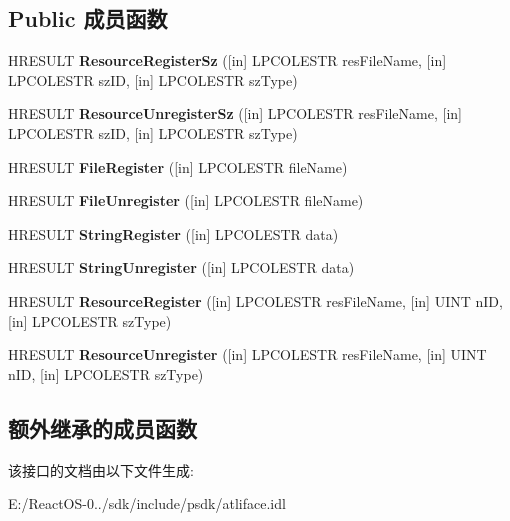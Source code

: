 \subsection*{Public 成员函数}
\begin{DoxyCompactItemize}
\item 
\mbox{\label{interface_i_registrar_aa97c1de08e4f4c6b7566a7c9be6d80df}} 
H\+R\+E\+S\+U\+LT {\bfseries Resource\+Register\+Sz} (\mbox{[}in\mbox{]} L\+P\+C\+O\+L\+E\+S\+TR res\+File\+Name, \mbox{[}in\mbox{]} L\+P\+C\+O\+L\+E\+S\+TR sz\+ID, \mbox{[}in\mbox{]} L\+P\+C\+O\+L\+E\+S\+TR sz\+Type)
\item 
\mbox{\label{interface_i_registrar_aa612d43e5518c7f2f600d6bc77cdf871}} 
H\+R\+E\+S\+U\+LT {\bfseries Resource\+Unregister\+Sz} (\mbox{[}in\mbox{]} L\+P\+C\+O\+L\+E\+S\+TR res\+File\+Name, \mbox{[}in\mbox{]} L\+P\+C\+O\+L\+E\+S\+TR sz\+ID, \mbox{[}in\mbox{]} L\+P\+C\+O\+L\+E\+S\+TR sz\+Type)
\item 
\mbox{\label{interface_i_registrar_a29a369e1816805ee2e0e9af9799609ca}} 
H\+R\+E\+S\+U\+LT {\bfseries File\+Register} (\mbox{[}in\mbox{]} L\+P\+C\+O\+L\+E\+S\+TR file\+Name)
\item 
\mbox{\label{interface_i_registrar_ad5a7091b8c89a3890f66e773734c1c3e}} 
H\+R\+E\+S\+U\+LT {\bfseries File\+Unregister} (\mbox{[}in\mbox{]} L\+P\+C\+O\+L\+E\+S\+TR file\+Name)
\item 
\mbox{\label{interface_i_registrar_a867bc505652f69dd84c8b916c601a6da}} 
H\+R\+E\+S\+U\+LT {\bfseries String\+Register} (\mbox{[}in\mbox{]} L\+P\+C\+O\+L\+E\+S\+TR data)
\item 
\mbox{\label{interface_i_registrar_affaba3f84fe6737b107e0eb86b851463}} 
H\+R\+E\+S\+U\+LT {\bfseries String\+Unregister} (\mbox{[}in\mbox{]} L\+P\+C\+O\+L\+E\+S\+TR data)
\item 
\mbox{\label{interface_i_registrar_abf4e8fa74a001891acdadc8776ada58a}} 
H\+R\+E\+S\+U\+LT {\bfseries Resource\+Register} (\mbox{[}in\mbox{]} L\+P\+C\+O\+L\+E\+S\+TR res\+File\+Name, \mbox{[}in\mbox{]} U\+I\+NT n\+ID, \mbox{[}in\mbox{]} L\+P\+C\+O\+L\+E\+S\+TR sz\+Type)
\item 
\mbox{\label{interface_i_registrar_a11f376e1746219f118e04c1a4c8bdf85}} 
H\+R\+E\+S\+U\+LT {\bfseries Resource\+Unregister} (\mbox{[}in\mbox{]} L\+P\+C\+O\+L\+E\+S\+TR res\+File\+Name, \mbox{[}in\mbox{]} U\+I\+NT n\+ID, \mbox{[}in\mbox{]} L\+P\+C\+O\+L\+E\+S\+TR sz\+Type)
\end{DoxyCompactItemize}
\subsection*{额外继承的成员函数}


该接口的文档由以下文件生成\+:\begin{DoxyCompactItemize}
\item 
E\+:/\+React\+O\+S-\/0../sdk/include/psdk/atliface.\+idl\end{DoxyCompactItemize}
